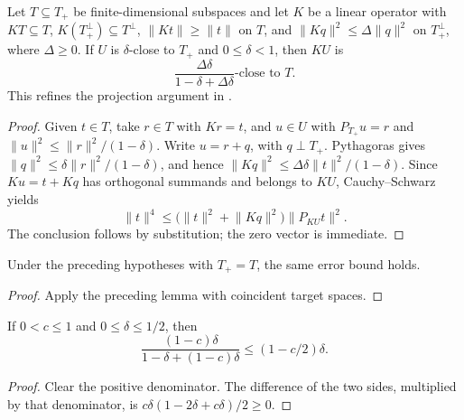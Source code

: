 \begin{lemma}
    \label{lem:subspace_nested_error_reduction_sharp}
    \leanok
    Let $T\subseteq T_+$ be finite-dimensional subspaces and let $K$ be a
    linear operator with $KT\subseteq T$, $K(T_+^\perp)\subseteq T^\perp$,
    $\lVert Kt\rVert\ge\lVert t\rVert$ on $T$, and
    $\lVert Kq\rVert^2\le\Delta\lVert q\rVert^2$ on $T_+^\perp$, where
    $\Delta\ge0$. If $U$ is $\delta$-close to $T_+$ and $0\le\delta<1$,
    then $KU$ is
    \[
        \frac{\Delta\delta}{1-\delta+\Delta\delta}\text{-close to }T.
    \]
    This refines the projection argument in
    \cite[Lemma~l:er, lines 597--622; Theorem~t:aisgapless, lines 1037--1041]
    {Arad2016RigorousRG}.
\end{lemma}

\begin{proof}
    \leanok
    Given $t\in T$, take $r\in T$ with $Kr=t$, and $u\in U$ with
    $P_{T_+}u=r$ and $\lVert u\rVert^2\le\lVert r\rVert^2/(1-\delta)$.
    Write $u=r+q$, with $q\perp T_+$. Pythagoras gives
    $\lVert q\rVert^2\le\delta\lVert r\rVert^2/(1-\delta)$, and hence
    $\lVert Kq\rVert^2\le\Delta\delta\lVert t\rVert^2/(1-\delta)$.
    Since $Ku=t+Kq$ has orthogonal summands and belongs to $KU$,
    Cauchy--Schwarz yields
    \[
        \lVert t\rVert^4
        \le \bigl(\lVert t\rVert^2+\lVert Kq\rVert^2\bigr)
        \lVert P_{KU}t\rVert^2.
    \]
    The conclusion follows by substitution; the zero vector is immediate.
\end{proof}

\begin{lemma}
    \label{lem:subspace_error_reduction_sharp}
    \leanok
    Under the preceding hypotheses with $T_+=T$, the same error bound holds.
\end{lemma}

\begin{proof}
    \leanok
    Apply the preceding lemma with coincident target spaces.
\end{proof}

\begin{lemma}
    \label{lem:normalized_filter_error_le}
    \leanok
    If $0<c\le1$ and $0\le\delta\le1/2$, then
    \[
        \frac{(1-c)\delta}{1-\delta+(1-c)\delta}
        \le(1-c/2)\delta.
    \]
\end{lemma}
\begin{proof}\leanok
    Clear the positive denominator. The difference of the two sides,
    multiplied by that denominator, is
    $c\delta(1-2\delta+c\delta)/2\ge0$.
\end{proof}

